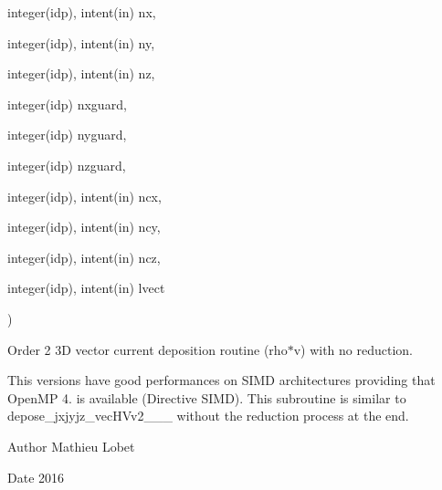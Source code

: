 {\begin{DoxyParamCaption}
\item[{integer(idp), intent(in)}]{nx, }
\item[{integer(idp), intent(in)}]{ny, }
\item[{integer(idp), intent(in)}]{nz, }
\item[{integer(idp)}]{nxguard, }
\item[{integer(idp)}]{nyguard, }
\item[{integer(idp)}]{nzguard, }
\item[{integer(idp), intent(in)}]{ncx, }
\item[{integer(idp), intent(in)}]{ncy, }
\item[{integer(idp), intent(in)}]{ncz, }
\item[{integer(idp), intent(in)}]{lvect}
\end{DoxyParamCaption}
)}\hypertarget{current__deposition_8_f90_a110bf577b181354401374e000770acbf}{}\label{current__deposition_8_f90_a110bf577b181354401374e000770acbf}


Order 2 3D vector current deposition routine (rho$\ast$v) with no reduction. 

This versions have good performances on S\+I\+MD architectures providing that Open\+MP 4. is available (Directive S\+I\+MD). This subroutine is similar to depose\+\_\+jxjyjz\+\_\+vec\+H\+Vv2\+\_\+\_\+\_ without the reduction process at the end. \begin{DoxyAuthor}{Author}
Mathieu Lobet 
\end{DoxyAuthor}
\begin{DoxyDate}{Date}
2016
\end{DoxyDate}

